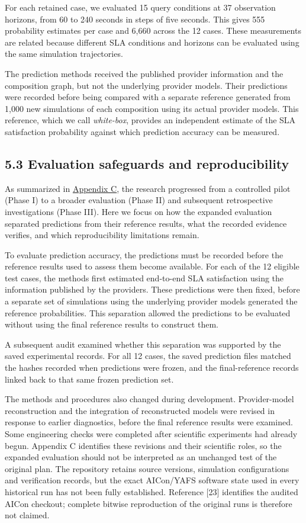 \documentclass[10pt,a4paper]{article}
\begin{document}
For each retained case, we evaluated 15 query conditions at 37 observation horizons, from 60 to 240 seconds in steps of five seconds. This gives 555 probability estimates per case and 6,660 across the 12 cases. These measurements are related because different SLA conditions and horizons can be evaluated using the same simulation trajectories.

The prediction methods received the published provider information and the composition graph, but not the underlying provider models. Their predictions were recorded before being compared with a separate reference generated from 1,000 new simulations of each composition using its actual provider models. This reference, which we call \emph{white-box}, provides an independent estimate of the SLA satisfaction probability against which prediction accuracy can be measured.

\subsection*{5.3 Evaluation safeguards and reproducibility}

As summarized in \hyperref[app:experiment-stages]{Appendix C}, the research progressed from a controlled pilot (Phase I) to a broader evaluation (Phase II) and subsequent retrospective investigations (Phase III). Here we focus on how the expanded evaluation separated predictions from their reference results, what the recorded evidence verifies, and which reproducibility limitations remain.

To evaluate prediction accuracy, the predictions must be recorded before the reference results used to assess them become available. For each of the 12 eligible test cases, the methods first estimated end-to-end SLA satisfaction using the information published by the providers. These predictions were then fixed, before a separate set of simulations using the underlying provider models generated the reference probabilities. This separation allowed the predictions to be evaluated without using the final reference results to construct them.

A subsequent audit examined whether this separation was supported by the saved experimental records. For all 12 cases, the saved prediction files matched the hashes recorded when predictions were frozen, and the final-reference records linked back to that same frozen prediction set.

The methods and procedures also changed during development. Provider-model reconstruction and the integration of reconstructed models were revised in response to earlier diagnostics, before the final reference results were examined. Some engineering checks were completed after scientific experiments had already begun. Appendix C identifies these revisions and their scientific roles, so the expanded evaluation should not be interpreted as an unchanged test of the original plan. The repository retains source versions, simulation configurations and verification records, but the exact AICon/YAFS software state used in every historical run has not been fully established. Reference [23] identifies the audited AICon checkout; complete bitwise reproduction of the original runs is therefore not claimed.
\end{document}
